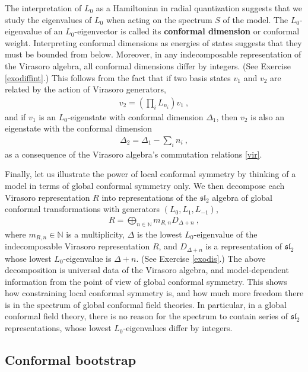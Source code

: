 \documentclass[12pt,a4paper,notitlepage]{report}
\numberwithin{equation}{section}
\theoremstyle{break}
\begin{document}
The interpretation of $L_0$ as a Hamiltonian in radial quantization suggests that we study the eigenvalues of $L_0$ when acting on the spectrum  $S$ of the model.
The $L_0$-eigenvalue of an $L_0$-eigenvector is called its \textbf{\boldmath conformal dimension} or conformal weight. 
Interpreting conformal dimensions as energies of states suggests that they
must be bounded from below.
Moreover, in any indecomposable representation of the Virasoro algebra, all conformal dimensions differ by integers. (See Exercise \ref{exodiffint}.) This follows from the fact that if 
two basis states $v_1$ and $v_2$ are related by the action of Virasoro generators,
\begin{align}
 v_2 = \left(\prod_i L_{n_i}\right) v_1\ ,
\label{vovt}
\end{align}
and if $v_1$ is an $L_0$-eigenstate with conformal dimension $\Delta_1$, then $v_2$ is also an eigenstate with the conformal dimension
\begin{align}
 \Delta_2 = \Delta_1 - \sum_i n_i\ ,
\label{ddsn}
\end{align}
as a consequence of the Virasoro algebra's commutation relations \eqref{vir}. 

Finally, let us illustrate the power of local conformal symmetry by thinking of a model in terms of global conformal symmetry only. 
We then decompose each Virasoro representation $R$ into representations of the $\mathfrak{sl}_2$ algebra of global conformal transformations with generators $(L_0,L_1,L_{-1})$,
\begin{align}
 R=\bigoplus_{n\in{\mathbb{N}}} m_{R,n} D_{\Delta+n}\ ,
\label{rbd}
\end{align}
where $m_{R,n}\in {\mathbb{N}}$ is a multiplicity, $\Delta$ is the lowest $L_0$-eigenvalue of the indecomposable Virasoro representation $R$, and $D_{\Delta+n}$ is a representation of $\mathfrak{sl}_2$ whose lowest $L_0$-eigenvalue is $\Delta+n$.
(See Exercise \ref{exodis}.)
The above decomposition is universal data of the Virasoro algebra, and 
model-dependent information from the point of view of global conformal symmetry.
This shows how constraining local conformal symmetry is, and how much more freedom there is in the spectrum of global conformal field theories.
In particular, in a global conformal field theory, there is no reason for the spectrum to contain series of
$\mathfrak{sl}_2$ representations, whose lowest $L_0$-eigenvalues differ by integers. 


\subsection{Conformal bootstrap}
\end{document}
